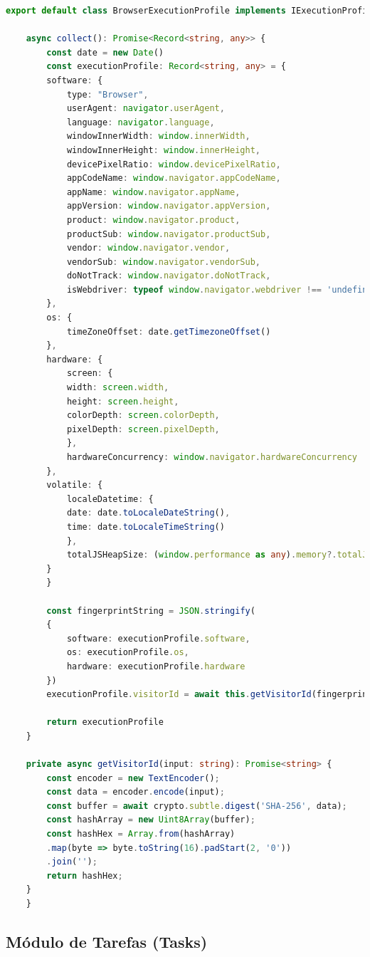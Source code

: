 \documentclass[12pt]{tcc}
\begin{document}
	\begin{lstlisting}[label={lst:browser_execution_profile_abstract_class}, caption={Implementação da classe responsável por representar um perfil de execução.}, language=TypeScript, breaklines=true]
	export default class BrowserExecutionProfile implements IExecutionProfile {

	async collect(): Promise<Record<string, any>> {
		const date = new Date()
		const executionProfile: Record<string, any> = {
		software: {
			type: "Browser",
			userAgent: navigator.userAgent,
			language: navigator.language,
			windowInnerWidth: window.innerWidth,
			windowInnerHeight: window.innerHeight,
			devicePixelRatio: window.devicePixelRatio,
			appCodeName: window.navigator.appCodeName,
			appName: window.navigator.appName,
			appVersion: window.navigator.appVersion,
			product: window.navigator.product,
			productSub: window.navigator.productSub,
			vendor: window.navigator.vendor,
			vendorSub: window.navigator.vendorSub,
			doNotTrack: window.navigator.doNotTrack,
			isWebdriver: typeof window.navigator.webdriver !== 'undefined' ? window.navigator.webdriver.toString() : 'unknown'
		},
		os: {
			timeZoneOffset: date.getTimezoneOffset()
		},
		hardware: {
			screen: {
			width: screen.width,
			height: screen.height,
			colorDepth: screen.colorDepth,
			pixelDepth: screen.pixelDepth,
			},
			hardwareConcurrency: window.navigator.hardwareConcurrency
		},
		volatile: {
			localeDatetime: {
			date: date.toLocaleDateString(),
			time: date.toLocaleTimeString()
			},
			totalJSHeapSize: (window.performance as any).memory?.totalJSHeapSize || -1
		}
		}

		const fingerprintString = JSON.stringify(
		{
			software: executionProfile.software,
			os: executionProfile.os,
			hardware: executionProfile.hardware
		})
		executionProfile.visitorId = await this.getVisitorId(fingerprintString)

		return executionProfile
	}

	private async getVisitorId(input: string): Promise<string> {
		const encoder = new TextEncoder();
		const data = encoder.encode(input);
		const buffer = await crypto.subtle.digest('SHA-256', data);
		const hashArray = new Uint8Array(buffer);
		const hashHex = Array.from(hashArray)
		.map(byte => byte.toString(16).padStart(2, '0'))
		.join('');
		return hashHex;
	}
	}
	\end{lstlisting}

	\subsection{Módulo de Tarefas (Tasks)}
	\label{subsection:modulo-tasks}
\end{document}
